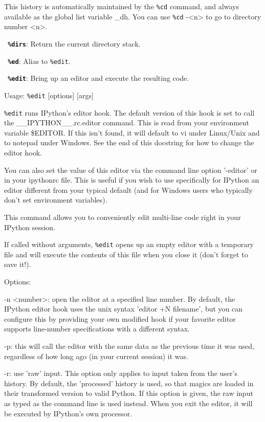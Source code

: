         This history is automatically maintained by the \texttt{\%cd} command, and
        always available as the global list variable \_dh. You can use \texttt{\%cd} -<n>
        to go to directory number <n>.

\bigskip
\texttt{\textbf{ \%dirs}}:
	Return the current directory stack.

\bigskip
\texttt{\textbf{ \%ed}}:
	Alias to \texttt{\%edit}.

\bigskip
\texttt{\textbf{ \%edit}}:
	Bring up an editor and execute the resulting code.

        Usage:
          \texttt{\%edit} [options] [args]

        \texttt{\%edit} runs IPython's editor hook.  The default version of this hook is
        set to call the \_\_IPYTHON\_\_.rc.editor command.  This is read from your
        environment variable \$EDITOR.  If this isn't found, it will default to
        vi under Linux/Unix and to notepad under Windows.  See the end of this
        docstring for how to change the editor hook.

        You can also set the value of this editor via the command line option
        '-editor' or in your ipythonrc file. This is useful if you wish to use
        specifically for IPython an editor different from your typical default
        (and for Windows users who typically don't set environment variables).

        This command allows you to conveniently edit multi-line code right in
        your IPython session.
        
        If called without arguments, \texttt{\%edit} opens up an empty editor with a
        temporary file and will execute the contents of this file when you
        close it (don't forget to save it!).


        Options:

        -n <number>: open the editor at a specified line number.  By default,
        the IPython editor hook uses the unix syntax 'editor +N filename', but
        you can configure this by providing your own modified hook if your
        favorite editor supports line-number specifications with a different
        syntax.
        
        -p: this will call the editor with the same data as the previous time
        it was used, regardless of how long ago (in your current session) it
        was.

        -r: use 'raw' input.  This option only applies to input taken from the
        user's history.  By default, the 'processed' history is used, so that
        magics are loaded in their transformed version to valid Python.  If
        this option is given, the raw input as typed as the command line is
        used instead.  When you exit the editor, it will be executed by
        IPython's own processor.
        
